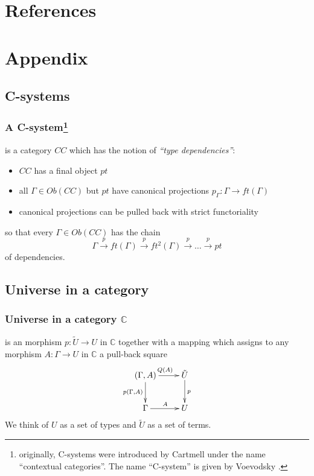 \documentclass[dvipdfmx]{beamer}
\begin{document}
\section{References}




\section*{Appendix}

\subsection*{C-systems}

\begin{frame}
  \frametitle{A C-system\footnote{
    originally, C-systems were introduced by Cartmell
    \cite{Cartmell1986209}
    under the name ``contextual categories''.
    The name ``C-system'' is given by Voevodsky
    \cite{voevodsky2014subsystems}.
    }
  }
  is a category $CC$ which has the notion of
  {\it ``type dependencies''}:
  \begin{itemize}
    \item $CC$ has a final object $pt$
    \item all $\Gamma \in Ob \left( CC \right)$ but $pt$
      have canonical projections
      $p_{\Gamma} : \Gamma \to ft \left( \Gamma \right)$
    \item canonical projections can be pulled back
      with strict functoriality
  \end{itemize}
  so that every $\Gamma \in Ob \left( CC \right)$
  has the chain
  \[
  \Gamma \overset{p}{\to} ft \left( \Gamma \right)
  \overset{p}{\to} ft^2 \left( \Gamma \right)
  \overset{p}{\to} \dots
  \overset{p}{\to} pt
  \]
  of dependencies.
\end{frame}

\subsection*{Universe in a category}

\begin{frame}
  \frametitle{Universe in a category ${\mathbb C}$}
  is an morphism $p : \tilde{U} \to U$ in ${\mathbb C}$
  together with a mapping which assigns to any morphism
  $A : \Gamma \to U$ in ${\mathbb C}$ a pull-back square
  \[
    \xymatrix{
      \left( \Gamma , A \right) \ar[r]^{Q \left( A \right)}
      \ar[d]_{p \left( \Gamma , A \right)}
        & \tilde{U} \ar[d]^{p}
        \\
        \Gamma \ar[r]^{A}
        & U
    }
  \]
  We think of $U$ as a set of types and
  $\tilde{U}$ as a set of terms.
\end{frame}
\end{document}
